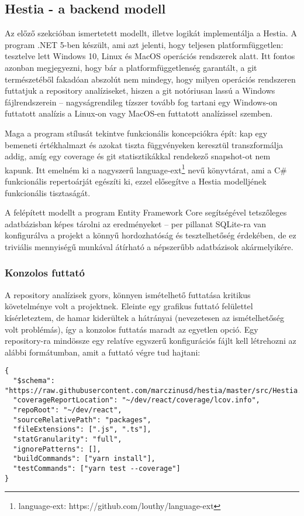 \subsection{Hestia - a backend modell}

Az előző szekcióban ismertetett modellt, illetve logikát implementálja a Hestia. A program .NET 5-ben készült, ami azt jelenti, hogy teljesen platformfüggetlen: tesztelve lett Windows 10, Linux és MacOS operációs rendszerek alatt. Itt fontos azonban megjegyezni, hogy bár a platformfüggetlenség garantált, a git természetéből fakadóan abszolút nem mindegy, hogy milyen operációs rendszeren futtatjuk a repository analíziseket, hiszen a git notóriusan lassú a Windows fájlrendszerein -- nagyságrendileg tízszer tovább fog tartani egy Windows-on futtatott analízis a Linux-on vagy MacOS-en futtatott analízissel szemben.

Maga a program stílusát tekintve funkcionális koncepciókra épít: kap egy bemeneti értékhalmazt és azokat tiszta függvényeken keresztül transzformálja addig, amíg egy coverage és git statisztikákkal rendekező snapshot-ot nem kapunk. Itt emelném ki a nagyszerű language-ext\footnote{language-ext: https://github.com/louthy/language-ext} nevű könyvtárat, ami a C\# funkcionális repertoárját egészíti ki, ezzel elősegítve a Hestia modelljének funkcionális tisztaságát.

A felépített modellt a program Entity Framework Core segítségével tetszőleges adatbázisban képes tárolni az eredményeket -- per pillanat SQLite-ra van konfigurálva a projekt a könnyű hordozhatóság és tesztelhetőség érdekében, de ez triviális mennyiségű munkával átírható a népszerűbb adatbázisok akármelyikére.

\subsubsection{Konzolos futtató}

A repository analízisek gyors, könnyen ismételhető futtatása kritikus követelménye volt a projektnek. Eleinte egy grafikus futtató felülettel kísérleteztem, de hamar kiderültek a hátrányai (nevezetesen az ismételhetőség volt problémás), így a konzolos futtatás maradt az egyetlen opció. Egy repository-ra mindössze egy relatíve egyszerű konfigurációs fájlt kell létrehozni az alábbi formátumban, amit a futtató végre tud hajtani:

\begin{lstlisting}
{
  "$schema": "https://raw.githubusercontent.com/marczinusd/hestia/master/src/Hestia.ConsoleRunner/config.schema.json",
  "coverageReportLocation": "~/dev/react/coverage/lcov.info",
  "repoRoot": "~/dev/react",
  "sourceRelativePath": "packages",
  "fileExtensions": [".js", ".ts"],
  "statGranularity": "full",
  "ignorePatterns": [],
  "buildCommands": ["yarn install"],
  "testCommands": ["yarn test --coverage"]
}
\end{lstlisting}

